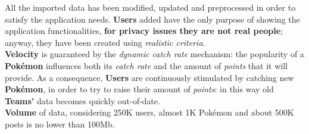 All the imported data has been modified, updated and preprocessed in order to satisfy the application needs. 
\textbf{Users} added have the only purpose of showing the application functionalities, \textbf{for privacy issues they are not real people}; anyway, they have been created using \textit{realistic criteria}. \medskip\\
\textbf{Velocity} is guaranteed by the \textit{dynamic catch rate} mechanism: the popularity of a \textbf{Pokémon} influences both its \textit{catch rate} and the amount of \textit{points} that it will provide. As a consequence, \textbf{Users} are continuously stimulated by catching new \textbf{Pokémon}, in order to try to raise their amount of \textit{points}: in this way old \textbf{Teams’} data becomes quickly out-of-date. \\
\textbf{Volume} of data, considering 250K users, almost 1K Pokémon and about 500K posts is no lower than 100Mb.\\
